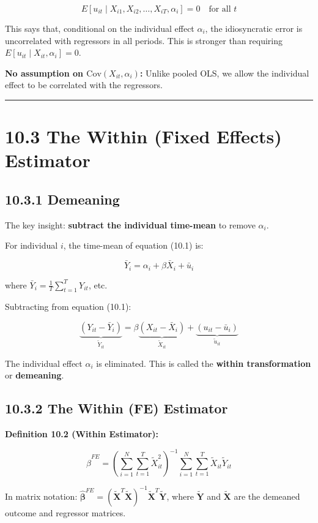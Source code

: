 \[
E[u_{it} \mid X_{i1}, X_{i2}, \ldots, X_{iT}, \alpha_i] = 0 \quad \text{for all } t
\]

This says that, conditional on the individual effect $\alpha_i$, the idiosyncratic error is uncorrelated with regressors in all periods. This is stronger than requiring $E[u_{it} \mid X_{it}, \alpha_i] = 0$.

\textbf{No assumption on $\text{Cov}(X_{it}, \alpha_i)$:} Unlike pooled OLS, we allow the individual effect to be correlated with the regressors.

\medskip\hrule\medskip

\section{10.3 The Within (Fixed Effects) Estimator}

\subsection{10.3.1 Demeaning}

The key insight: \textbf{subtract the individual time-mean} to remove $\alpha_i$.

For individual $i$, the time-mean of equation (10.1) is:

\[
\bar{Y}_i = \alpha_i + \beta \bar{X}_i + \bar{u}_i
\]

where $\bar{Y}_i = \frac{1}{T}\sum_{t=1}^T Y_{it}$, etc.

Subtracting from equation (10.1):

\[
\underbrace{(Y_{it} - \bar{Y}_i)}_{\tilde{Y}_{it}} = \beta \underbrace{(X_{it} - \bar{X}_i)}_{\tilde{X}_{it}} + \underbrace{(u_{it} - \bar{u}_i)}_{\tilde{u}_{it}}
\]

The individual effect $\alpha_i$ is eliminated. This is called the \textbf{within transformation} or \textbf{demeaning}.

\subsection{10.3.2 The Within (FE) Estimator}

\textbf{Definition 10.2 (Within Estimator):}

\[
\hat{\beta}^{FE} = \left(\sum_{i=1}^N \sum_{t=1}^T \tilde{X}_{it}^2\right)^{-1} \sum_{i=1}^N \sum_{t=1}^T \tilde{X}_{it} \tilde{Y}_{it}
\]

In matrix notation: $\hat{\boldsymbol{\beta}}^{FE} = (\tilde{\mathbf{X}}^T\tilde{\mathbf{X}})^{-1}\tilde{\mathbf{X}}^T\tilde{\mathbf{Y}}$, where $\tilde{\mathbf{Y}}$ and $\tilde{\mathbf{X}}$ are the demeaned outcome and regressor matrices.

